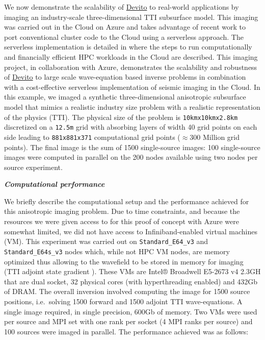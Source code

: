 \documentclass[conference]{IEEEtran}
\begin{document}
We now demonstrate the scalability of \href{https://github.com/devitocodes/devito}{Devito} to real-world applications by
imaging an industry-scale three-dimensional TTI subsurface model. This
imaging was carried out in the Cloud on Azure and takes advantage of
recent work to port conventional cluster code to the Cloud using a
serverless approach. The serverless implementation is detailed in
\cite{witte2019TPDedas, witte2019SEGedw} where the steps to run
computationally and financially efficient HPC workloads in the Cloud are
described. This imaging project, in collaboration with Azure, demonstrates
the scalability and robustness of \href{https://github.com/devitocodes/devito}{Devito} to large scale wave-equation
based inverse problems in combination with a cost-effective serverless
implementation of seismic imaging in the Cloud. In this example, we imaged
a synthetic three-dimensional anisotropic subsurface model that mimics a
realistic industry size problem with a realistic representation of the
physics (TTI). The physical size of the problem is
\texttt{10kmx10kmx2.8km} discretized on a \texttt{12.5m} grid with
absorbing layers of width 40 grid points on each side leading to
\texttt{881x881x371} computational grid points ($\approx300$ Million grid
points). The final image is the sum of 1500 single-source images: 100
single-source images were computed in parallel on the 200 nodes available
using two nodes per source experiment.

\textbf{\emph{Computational performance}}

We briefly describe the computational setup and the performance achieved
for this anisotropic imaging problem. Due to time constraints, and because
the resources we were given access to for this proof of concept with Azure
were somewhat limited, we did not have access to Infiniband-enabled
virtual machines (VM). This experiment was carried out on
\texttt{Standard\_E64\_v3} and \texttt{Standard\_E64s\_v3} nodes which,
while not HPC VM nodes, are memory optimized thus allowing to the
wavefield to be stored in memory for imaging (TTI adjoint state gradient
\cite{virieux, louboutin2018segeow}). These VMs are Intel® Broadwell
E5-2673 v4 2.3GH that are dual socket, 32 physical cores (with
hyperthreading enabled) and 432Gb of DRAM.  The overall inversion involved
computing the image for 1500 source positions, i.e.~solving 1500 forward
and 1500 adjoint TTI wave-equations. A single image required, in single
precision, 600Gb of memory. Two VMs were used per source and MPI set with
one rank per socket (4 MPI ranks per source) and 100 sources were imaged
in parallel. The performance achieved was as follows:
\end{document}
